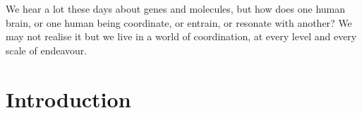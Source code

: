 



\begin{savequote}[8cm]

    We hear a lot these days about genes and molecules, but how does one human brain, or one human being coordinate, or entrain, or resonate with another?  We may not realise it but we live in a world of coordination, at every level and every scale of endeavour.

\end{savequote}




\chapter{\label{chap:intro}Introduction}



\minitoc






